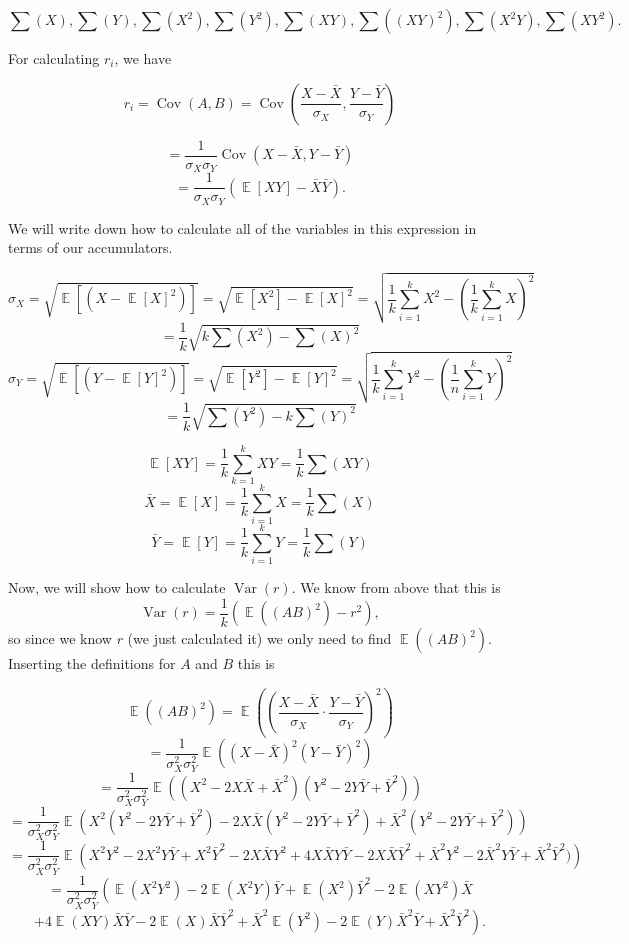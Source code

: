 \documentclass{article}
\DeclareMathOperator{\E}{\mathbb{E}}
\DeclareMathOperator{\Cov}{\mathrm{Cov}}
\DeclareMathOperator{\Var}{\mathrm{Var}}
\begin{document}
$$\sum(X), \sum(Y), \sum(X^2), \sum(Y^2), \sum(XY), \sum((XY)^2), \sum(X^2 Y), \sum(XY^2).$$

For calculating $r_i$, we have

$$r_i = \Cov(A, B) = \Cov \left( \frac{X - \bar X}{\sigma_X}, \frac{Y - \bar Y}{\sigma_Y}\right)$$

$$= \frac{1}{\sigma_X \sigma_Y} \Cov(X - \bar X, Y - \bar Y)$$
$$ = \frac{1}{\sigma_X \sigma_Y} (\E[XY] - \bar X \bar Y).$$

We will write down how to calculate all of the variables in this expression in terms of our accumulators.

$$\sigma_X = \sqrt{\E[(X - \E[X]^2)]}
= \sqrt{\E[X^2] - \E[X]^2}
= \sqrt{\frac{1}{k} \sum_{i = 1}^k X^2 - \left(\frac{1}{k} \sum_{i=1}^k X \right)^2}$$
$$= \frac{1}{k} \sqrt{k\sum(X^2) - \sum(X)^2}
$$
$$\sigma_Y = \sqrt{\E[(Y - \E[Y]^2)]}
= \sqrt{\E[Y^2] - \E[Y]^2}
= \sqrt{\frac{1}{k} \sum_{i = 1}^k Y^2 - \left(\frac{1}{n} \sum_{i=1}^k Y \right)^2}$$
$$= \frac{1}{k} \sqrt{\sum(Y^2) - k\sum(Y)^2}
$$
 
$$\E[XY] = \frac{1}{k} \sum_{k = 1}^k X Y = \frac{1}{k} \sum(XY)$$
$$\bar X = \E[X] = \frac{1}{k} \sum_{i = 1}^k X = \frac{1}{k} \sum(X)$$
$$\bar Y = \E[Y] = \frac{1}{k} \sum_{i = 1}^k Y = \frac{1}{k} \sum(Y)$$

Now, we will show how to calculate $\Var(r).$ We know from above that this is
$$\Var(r) = \frac{1}{k}\left(\E((AB)^2) - r^2\right),$$
so since we know $r$ (we just calculated it) we only need to find $\E((AB)^2)$. Inserting the definitions for $A$ and $B$ this is

$$\E((AB)^2) = \E\left(\left(\frac{X - \bar X}{\sigma_X} \cdot \frac{Y - \bar Y}{\sigma_Y} \right)^2 \right)$$
$$ = \frac{1}{\sigma_X^2 \sigma_Y^2}\E\left((X - \bar X)^2(Y - \bar Y)^2 \right)$$
$$= \frac{1}{\sigma_X^2 \sigma_Y^2}\E\left((X^2 - 2X\bar X + \bar X^2)(Y^2 - 2Y\bar Y + \bar Y^2) \right)$$
$$= \frac{1}{\sigma_X^2 \sigma_Y^2}\E\left(X^2(Y^2 - 2Y\bar Y + \bar Y^2) - 2X\bar X(Y^2 - 2Y\bar Y + \bar Y^2) + \bar X^2(Y^2 - 2Y\bar Y + \bar Y^2) \right)$$
$$= \frac{1}{\sigma_X^2 \sigma_Y^2}\E\left(X^2Y^2 - 2X^2Y\bar Y + X^2\bar Y^2 - 2X\bar X Y^2 + 4X\bar XY\bar Y  - 2X\bar X \bar Y^2 + \bar X^2Y^2 - 2\bar X^2Y\bar Y + \bar X^2\bar Y^2) \right)$$
$$= \frac{1}{\sigma_X^2 \sigma_Y^2}\left(\E(X^2Y^2) - 2\E(X^2Y)\bar Y + \E(X^2)\bar Y^2 - 2\E(XY^2)\bar X\right.$$ 
$$\left. + 4\E(XY) \bar X\bar Y  - 2\E(X) \bar X \bar Y^2 + \bar X^2 \E(Y^2) - 2\E(Y)\bar X^2\bar Y + \bar X^2\bar Y^2 \right).$$
\end{document}
